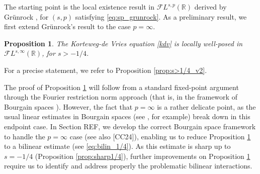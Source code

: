 \documentclass[%
11pt,  reqno]{amsart}
\newcommand{\5}{\textup{V}}
\newtheorem{proposition}[theorem]{Proposition}
\theoremstyle{remark}
\newcommand{\R}{\mathbb{R}}
\numberwithin{equation}{section}
\numberwithin{theorem}{section}
\begin{document}
	
	The starting point is the local existence result in $\mathcal{F}L^{s,p}(\R)$ derived by Grünrock \cite{Grunrock_ldv_hier}, for $(s,p)$ satisfying \eqref{eq:sp_grunrock}.
	As a preliminary result, we first extend Grünrock's result to the case $p=\infty$.
	\begin{proposition}\label{prop:s>1/4}
		The Korteweg-de Vries equation \eqref{kdv} is locally well-posed in $\mathcal{F}L^{s,\infty}(\R)$, for $s>-1/4$.
	\end{proposition}
	\noindent For a precise statement, we refer to Proposition \ref{prop:s>1/4_v2}.
	
	\medskip
	The proof of Proposition \ref{prop:s>1/4} will follow from a standard fixed-point argument through the Fourier restriction norm approach (that is, in the framework of Bourgain spaces \cite{bourg1, bourg2}). However, the fact that $p=\infty$ is a rather delicate point, as the usual linear estimates in Bourgain spaces (see \cite{Grunrock_mkdv,HerrGrunrock_FL}, for example) break down in this endpoint case. In Section REF, we develop the correct Bourgain space framework to handle the $p=\infty$ case (see also [CC24]), enabling us to reduce Proposition \ref{prop:s>1/4} to a bilinear estimate (see \eqref{eq:bilin_1/4}). As this estimate is sharp up to $s=-1/4$ (Proposition \ref{prop:sharp1/4}), further improvements on Proposition \ref{prop:s>1/4} require us to identify and address properly the problematic bilinear interactions.
	
\end{document}
